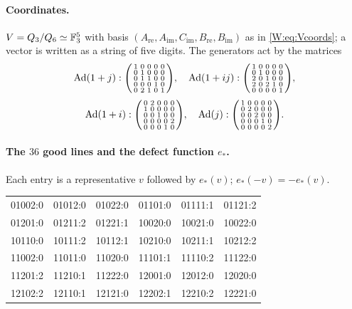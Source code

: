 \paragraph{Coordinates.}  $V=Q_3/Q_6\simeq\mathbb F_3^5$ with basis
$(A_{\mathrm{re}},A_{\mathrm{im}},C_{\mathrm{im}},B_{\mathrm{re}},B_{\mathrm{im}})$
as in \eqref{W:eq:Vcoords}; a vector is written as a string of five
digits.  The generators act by the matrices
\[
\operatorname{Ad}(1+j):\begin{psmallmatrix}1&0&0&0&0\\0&1&0&0&0\\0&1&1&0&0\\0&0&0&1&0\\0&2&1&0&1\end{psmallmatrix},\quad
\operatorname{Ad}(1+ij):\begin{psmallmatrix}1&0&0&0&0\\0&1&0&0&0\\2&0&1&0&0\\2&0&2&1&0\\0&0&0&0&1\end{psmallmatrix},
\]
\[
\operatorname{Ad}(1+i):\begin{psmallmatrix}0&2&0&0&0\\1&0&0&0&0\\0&0&1&0&0\\0&0&0&0&2\\0&0&0&1&0\end{psmallmatrix},\quad
\operatorname{Ad}(j):\begin{psmallmatrix}1&0&0&0&0\\0&2&0&0&0\\0&0&2&0&0\\0&0&0&1&0\\0&0&0&0&2\end{psmallmatrix}.
\]
\paragraph{The $36$ good lines and the defect function $e_*$.}
Each entry is a representative $v$ followed by $e_*(v)$; $e_*(-v)=-e_*(v)$.
\begin{center}\small\ttfamily
\begin{tabular}{llllll}
01002:0&01012:0&01022:0&01101:0&01111:1&01121:2\\
01201:0&01211:2&01221:1&10020:0&10021:0&10022:0\\
10110:0&10111:2&10112:1&10210:0&10211:1&10212:2\\
11002:0&11011:0&11020:0&11101:1&11110:2&11122:0\\
11201:2&11210:1&11222:0&12001:0&12012:0&12020:0\\
12102:2&12110:1&12121:0&12202:1&12210:2&12221:0\\
\end{tabular}
\end{center}
